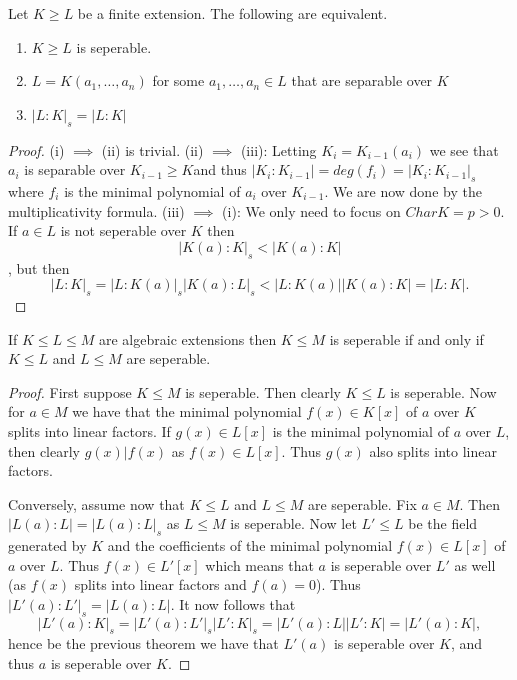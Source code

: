 \documentclass[twoside, a4paper, 10pt]{amsart}
\begin{document}
\begin{thm} Let $K \geq L$ be a finite extension. The following are equivalent.

\begin{enumerate}
	\item $K \geq L$ is seperable.
	\item $L = K(a_1, \ldots, a_n)$ for some $a_1, \ldots, a_n \in L$ that are separable over $K$
	\item $|L:K|_s = |L:K|$
\end{enumerate}

\end{thm}

\begin{proof} (i) $\implies$ (ii) is trivial. (ii) $\implies$ (iii): Letting $K_i = K_{i-1}(a_i)$ we see that $a_i$ is separable over $K_{i-1} \geq K$and thus $|K_{i}:K_{i-1}| = deg(f_i) = |K_i:K_{i-1}|_s$ where $f_i$ is the minimal polynomial of $a_i$ over $K_{i-1}$. We are now done by the multiplicativity formula. (iii) $\implies$ (i): We only need to focus on $Char K = p >0$. If $a \in L$ is not seperable over $K$ then $$|K(a):K|_s < |K(a):K|$$, but then $$|L:K|_s = |L:K(a)|_s |K(a):L|_s < |L:K(a)||K(a):K| = |L:K|.$$ 

\end{proof}

\begin{corol} If $K \leq L \leq M$ are algebraic extensions then $K \leq M$ is seperable if and only if $K \leq L$ and $L \leq M$ are seperable.

\end{corol}

\begin{proof} First suppose $K \leq M$ is seperable. Then clearly $K \leq L$ is seperable. Now for $a \in M$ we have that the minimal polynomial $f(x) \in K[x]$ of $a$ over $K$ splits into linear factors. If $g(x) \in L[x]$ is the minimal polynomial of $a$ over $L$, then clearly $g(x) | f(x)$ as $f(x) \in L[x]$. Thus $g(x)$ also splits into linear factors.

Conversely, assume now that $K \leq L$ and $L \leq M$ are seperable. Fix $a \in M$. Then $|L(a):L| = |L(a):L|_s$ as $L \leq M$ is seperable. Now let $L' \leq L$ be the field generated by $K$ and the coefficients of the minimal polynomial $f(x) \in L[x]$ of $a$ over $L$. Thus $f(x) \in L'[x]$ which means that $a$ is seperable over $L'$ as well (as $f(x)$ splits into linear factors and $f(a) = 0$). Thus $|L'(a):L'|_s = |L(a):L|$. It now follows that $$|L'(a):K|_s = |L'(a):L'|_s |L':K|_s = |L'(a):L||L':K| = |L'(a):K|,$$ hence be the previous theorem we have that $L'(a)$ is seperable over $K$, and thus $a$ is seperable over $K$. \end{proof}
\end{document}
